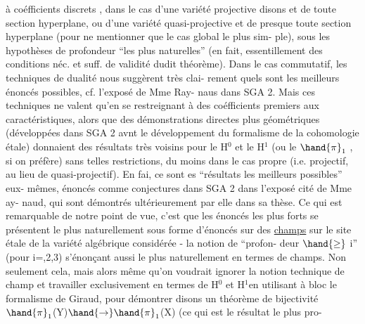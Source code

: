 
à coéfficients discrets , dans le cas d'une variété projective disons et
de toute section hyperplane, ou d'une variété quasi-projective et de presque
toute section hyperplane (pour ne mentionner que le cas global le plus sim-%
ple), sous les hypothèses de profondeur  ``les plus naturelles'' (en fait,
essentillement des conditions néc. et suff. de validité dudit théorème).
Dans le cas commutatif, les techniques de dualité nous suggèrent très clai-%
rement quels sont les meilleurs énoncés possibles, cf. l'exposé de Mme Ray-%
naus dans SGA 2. Mais ces techniques ne valent qu'en se restreignant à des
coéfficients premiers aux caractéristiques, alors que des démonstrations
directes plus géométriques (développées dans SGA 2 avnt le développement
du formalisme de la cohomologie étale) donnaient des résultats très voisins
pour le H$^0$ et le H$^1$ (ou le  $\hand{\pi}_1$ , si on préfère) sans telles restrictions,
du moins dans le cas propre (i.e. projectif, au lieu de quasi-projectif).
En fai, ce sont  es ``résultats les meilleurs possibles'' eux-%
mêmes, énoncés comme conjectures dans SGA 2 dans l'exposé cité de Mme ay-%
naud, qui sont démontrés ultérieurement par elle dans sa thèse. Ce qui est
remarquable de notre point de vue, c'est que les énoncés les plus forts se
présentent le plus naturellement sous forme d'énoncés sur des \uline{champs} sur
le site étale de la variété algébrique considérée - la notion de ``profon-%
deur $\hand{\geq}$ i'' (pour i=,2,3) s'énonçant aussi le plus naturellement en termes
de champs. Non seulement cela, mais alors même qu'on voudrait ignorer la
notion technique de champ et travailler exclusivement en termes de H$^0$ et
H$^1$en utilisant à bloc le formalisme  de Giraud, pour démontrer disons un
théorème de bijectivité $\hand{\pi}_1$(Y)$\hand{\to}\hand{\pi}_1$(X) (ce qui est le résultat le plus pro-%
